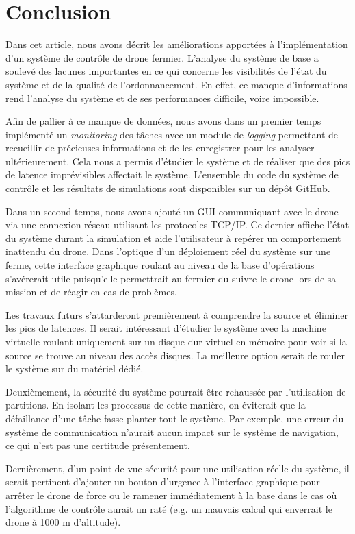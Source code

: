 \documentclass[journal]{IEEEtran}
\begin{document}
\section{Conclusion}
Dans cet article, nous avons décrit les améliorations apportées à l'implémentation d'un système de contrôle de drone fermier. L'analyse du système de base a soulevé des lacunes importantes en ce qui concerne les visibilités de l'état du système et de la qualité de l'ordonnancement. En effet, ce manque d'informations rend l'analyse du système et de ses performances difficile, voire impossible. 

Afin de pallier à ce manque de données, nous avons dans un premier temps implémenté un \textit{monitoring} des tâches avec un module de \textit{logging} permettant de recueillir de précieuses informations et de les enregistrer pour les analyser ultérieurement. Cela nous a permis d'étudier le système et de réaliser que des pics de latence imprévisibles affectait le système.
L'ensemble du code du système de contrôle et les résultats de simulations sont disponibles sur un dépôt GitHub\cite{ref:code}.

Dans un second temps, nous avons ajouté un GUI communiquant avec le drone via une connexion réseau utilisant les protocoles TCP/IP. Ce dernier affiche l'état du système durant la simulation et aide l'utilisateur à repérer un comportement inattendu du drone. Dans l'optique d'un déploiement réel du système sur une ferme, cette interface graphique roulant au niveau de la base d'opérations s'avérerait utile puisqu'elle permettrait au fermier du suivre le drone lors de sa mission et de réagir en cas de problèmes.

Les travaux futurs s'attarderont premièrement à comprendre la source et éliminer les pics de latences. Il serait intéressant d'étudier le système avec la machine virtuelle roulant uniquement sur un disque dur virtuel en mémoire pour voir si la source se trouve au niveau des accès disques. La meilleure option serait de rouler le système sur du matériel dédié.

Deuxièmement, la sécurité du système pourrait être rehaussée par l'utilisation de partitions. En isolant les processus de cette manière, on éviterait que la défaillance d'une tâche fasse planter tout le système. Par exemple, une erreur du système de communication n'aurait aucun impact sur le système de navigation, ce qui n'est pas une certitude présentement.

Dernièrement, d'un point de vue sécurité pour une utilisation réelle du système, il serait pertinent d'ajouter un bouton d'urgence à l'interface graphique pour arrêter le drone de force ou le ramener immédiatement à la base dans le cas où l'algorithme de contrôle aurait un raté (e.g. un mauvais calcul qui enverrait le drone à 1000 m d'altitude). 
\end{document}
